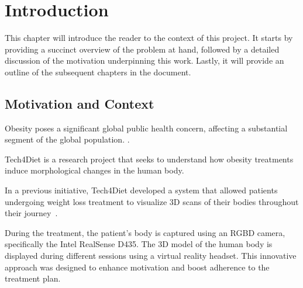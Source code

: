 \chapter{Introduction}

This chapter will introduce the reader to the context of this project. It
starts by providing a succinct overview of the problem at hand, followed by a
detailed discussion of the motivation underpinning this work. Lastly, it will
provide an outline of the subsequent chapters in the document.

\section{Motivation and Context}

Obesity poses a significant global public health concern, affecting a
substantial segment of the global population. .

Tech4Diet is a research project that seeks to understand how obesity treatments
induce morphological changes in the human body. 

In a previous initiative,  Tech4Diet developed a
system that allowed patients undergoing weight loss treatment to visualize 3D
scans of their bodies throughout their journey~\cite{Azorin-Lopez2020}.

During the treatment, the patient's body is captured using an RGBD camera,
specifically the Intel RealSense D435. The 3D model of the human body is
displayed during different sessions using a virtual reality headset. This
innovative approach was designed to enhance motivation and boost adherence to
the treatment plan.


